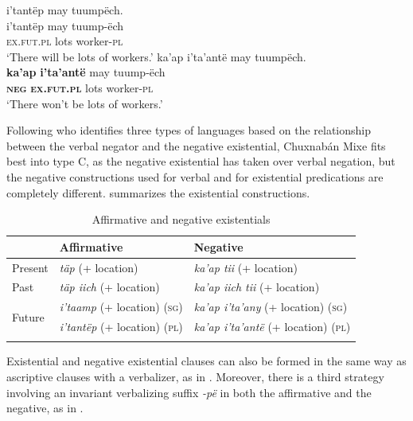 \documentclass[output=paper,colorlinks,citecolor=brown,draft]{langscibook}
\begin{document}
\ea\label{ex:mix:59}
    \ea\label{ex:mix:59a}
        \glll i’tantëp may tuumpëch.\\ 
              i’tantëp may tuump-ëch\\
              \textsc{ex.fut.pl} lots worker\textsc{{}-pl}\\
        \glt ‘There will be lots of workers.’
    \ex\label{ex:mix:59b}
        \glll  ka’ap i'ta’antë may tuumpëch.\\
             \textbf{ka’ap} \textbf{i'ta’antë} may tuump-ëch\\
             \textbf{\textsc{neg}} \textsc{\textbf{ex.fut.pl}} lots worker\textsc{{}-pl}\\
        \glt ‘There won’t be lots of workers.’
    \z
\z 

Following \citet{Croft1991} who identifies three types of languages based on the relationship between the verbal negator and the negative existential, Chuxnabán Mixe fits best into type C, as the negative existential has taken over verbal negation, but the negative constructions used for verbal and for existential predications are completely different.  summarizes the existential constructions.

\begin{table}
\begin{tabularx}{\textwidth}{lXX}
\lsptoprule
& {Affirmative} & {Negative}\\
\midrule 
{Present} & {\textit{täp} (+ location)} & {\textit{ka’ap tii} (+ location)}\\
{Past} & {\textit{täp iich} (+ location)} & {\textit{ka’ap iich tii} (+ location)}\\
\multirow{2}{*}{Future} & {\textit{i'taamp} (+ location) \textsc{(sg)}} &{\textit{ka’ap i'ta’any} (+ location) \textsc{(sg)}}\\
& {\textit{i'tantëp} (+ location) \textsc{(pl)}} & {\textit{ka’ap i'ta’antë} (+ location) \textsc{(pl)}}\\
\lspbottomrule
\end{tabularx}
\caption{Affirmative and negative existentials}
\label{tab:mix:6}
\end{table}

Existential and negative existential clauses can also be formed in the same way as ascriptive clauses with a verbalizer, as in . Moreover, there is a third strategy involving an invariant verbalizing suffix \textit{{}-pë} in both the affirmative and the negative, as in . 
\end{document}
